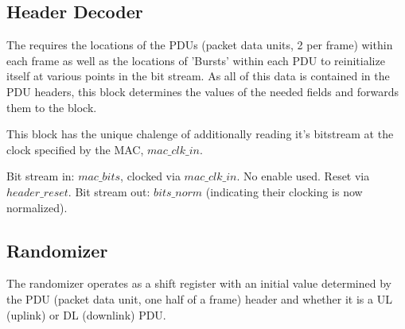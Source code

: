 \documentclass[10pt]{article}
\begin{document}
	\subsection{Header Decoder}
	The \cite{Randomizer} requires the locations of the PDUs (packet data
	units, 2 per frame) within each frame as well as the locations of
	'Bursts' within each PDU to reinitialize itself at various points in
	the bit stream. As all of this data is contained in the PDU headers,
	this block determines the values of the needed fields and forwards
	them to the \cite{Control Logic} block.

	This block has the unique chalenge of additionally reading it's
	bitstream at the clock specified by the MAC, $mac\_clk\_in$.

	Bit stream in: $mac\_bits$, clocked via $mac\_clk\_in$.
	No enable used. Reset via $header\_reset$. Bit stream out:
	$bits\_norm$ (indicating their clocking is now normalized).

	\subsection{Randomizer}
	The randomizer operates as a shift register with an initial value
	determined by the PDU (packet data unit, one half of a frame) header
	and whether it is a UL (uplink) or DL (downlink) PDU. 
\end{document}

